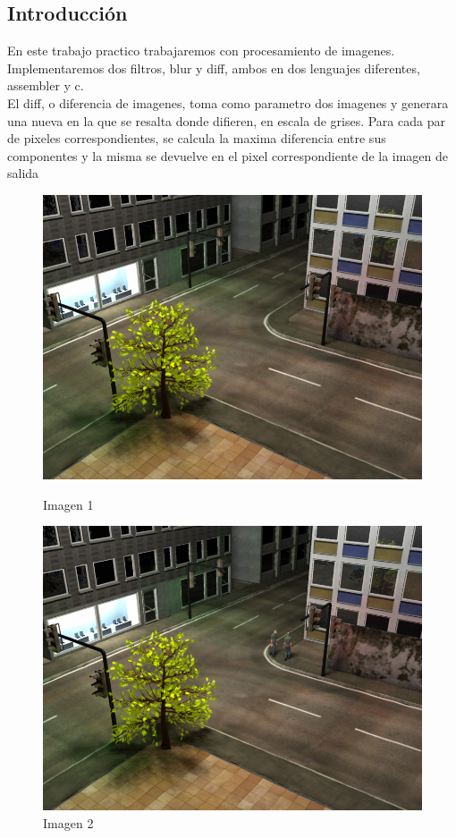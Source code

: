 

\subsection{Introducción}

En este trabajo practico trabajaremos con procesamiento de imagenes. Implementaremos dos filtros, blur y diff, ambos en dos lenguajes diferentes, assembler y c. \\


El diff, o diferencia de imagenes, toma como parametro dos imagenes y generara una nueva en la que se resalta donde difieren, en escala de grises. Para cada par de pixeles correspondientes, se calcula la maxima diferencia entre sus componentes y la misma se devuelve en el pixel correspondiente de la imagen de salida \\


\begin{figure}[H]
\begin{center}

  \includegraphics[width=\linewidth]{img/scene0(1).png}
  \caption{{\small Imagen 1}} 
\endminipage
{}
  \includegraphics[width=\linewidth]{img/scene400.png}
  \caption{{\small Imagen 2}} 
\endminipage

\end{center}
\end{figure}

